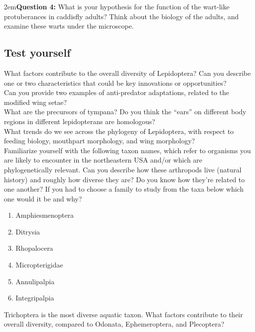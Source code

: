 \documentclass[letterpaper, 11pt]{article}
\begin{document}
\hangindent2em\textbf{Question 4:} What is your hypothesis for the function of the wart-like protuberances in caddisfly adults? Think about the biology of the adults, and examine these warts under the microscope.

\FloatBarrier

\subsection*{Test yourself}
\noindent{}What factors contribute to the overall diversity of Lepidoptera? Can you describe one or two characteristics that could be key innovations or opportunities? \\

\noindent{}Can you provide two examples of anti-predator adaptations, related to the modified wing setae? \\

\noindent{}What are the precursors of tympana? Do you think the ``ears'' on different body regions in different lepidopterans are homologous? \\ 

\noindent{}What trends do we see across the phylogeny of Lepidoptera, with respect to feeding biology, mouthpart morphology, and wing morphology? \\

\noindent{}Familiarize yourself with the following taxon names, which refer to organisms you are likely to encounter in the northeastern USA and/or which are phylogenetically relevant. Can you describe how these arthropods live (natural history) and roughly how diverse they are? Do you know how they're related to one another? If you had to choose a family to study from the taxa below which one would it be and why?

\begin{enumerate} 
\item Amphiesmenoptera
\item Ditrysia
\item Rhopalocera
\item Micropterigidae
\item Annulipalpia
\item Integripalpia
\end{enumerate}

\noindent{}Trichoptera is the most diverse aquatic taxon. What factors contribute to their overall diversity, compared to Odonata, Ephemeroptera, and Plecoptera?\\
\end{document}
